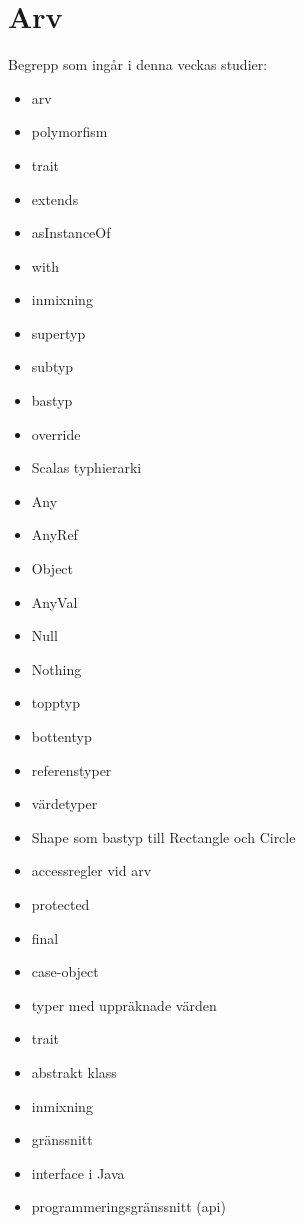 \chapter{Arv}\label{chapter:W10}
Begrepp som ingår i denna veckas studier:
\begin{multicols}{2}\begin{itemize}[noitemsep,label={$\square$},leftmargin=*]
\item arv
\item polymorfism
\item trait
\item extends
\item asInstanceOf
\item with
\item inmixning
\item supertyp
\item subtyp
\item bastyp
\item override
\item Scalas typhierarki
\item Any
\item AnyRef
\item Object
\item AnyVal
\item Null
\item Nothing
\item topptyp
\item bottentyp
\item referenstyper
\item värdetyper
\item Shape som bastyp till Rectangle och Circle
\item accessregler vid arv
\item protected
\item final
\item case-object
\item typer med uppräknade värden
\item trait
\item abstrakt klass
\item inmixning
\item gränssnitt
\item interface i Java
\item programmeringsgränssnitt (api)\end{itemize}\end{multicols}
